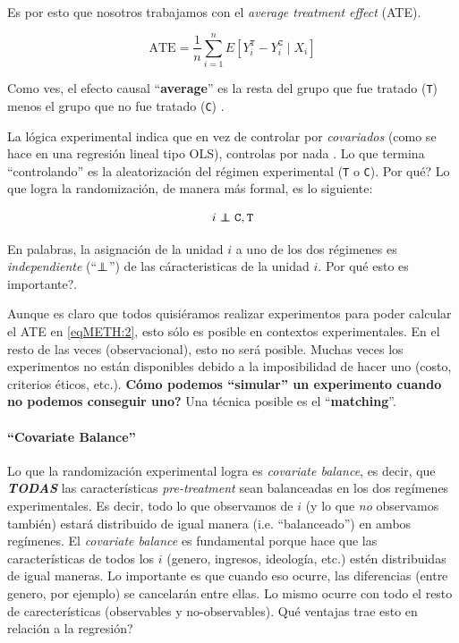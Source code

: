 \documentclass[onesided]{article}\usepackage[]{graphicx}\usepackage[]{color}
\newcommand\independent{\protect\mathpalette{\protect\independenT}{\perp}}
\def\independenT#1#2{\mathrel{\rlap{$#1#2$}\mkern2mu{#1#2}}}
\begin{document}
\paragraph{}Es por esto que nosotros trabajamos con el \emph{average treatment effect} (ATE).

\begin{equation}\label{eqMETH:2}
\text{ATE} = \frac{1}{n}\sum^{n}_{i=1} E[Y_{i}^{\texttt{T}}-Y_{i}^{\texttt{C}} \;|\; X_{i} ]
\end{equation}


Como ves, el efecto causal ``{\bf average}'' es la resta del grupo que fue tratado  (\texttt{T})  menos el grupo que no fue tratado (\texttt{C}) \parencite[204]{Ho2006}.

La l\'ogica experimental indica que en vez de controlar por \emph{covariados} (como se hace en una regresi\'on lineal tipo OLS), controlas por nada \parencite[6]{Guo:2009il}. Lo que termina ``controlando'' es la aleatorizaci\'on del r\'egimen experimental (\texttt{T} o \texttt{C}). {\color{red}Por qu\'e?} Lo que logra la randomizaci\'on, de manera m\'as formal, es lo siguiente:

\begin{equation}\label{eqMETH:5b}
i \independent \text{\texttt{C}}, \text{\texttt{T}}
\end{equation}

En palabras, la asignaci\'on de la unidad $i$ a uno de los dos r\'egimenes es \emph{independiente} (``$\independent$'') de las c\'aracteristicas de la unidad $i$. {\color{red}Por qu\'e esto es importante?}.

Aunque es claro que todos quisi\'eramos realizar experimentos para poder calcular el ATE en \autoref{eqMETH:2}, esto s\'olo es posible en contextos experimentales. En el resto de las veces (observacional), esto no ser\'a posible. Muchas veces los experimentos no est\'an disponibles debido a la imposibilidad de hacer uno (costo, criterios \'eticos, etc.). {\bf C\'omo podemos ``simular'' un experimento cuando no podemos conseguir uno?} Una t\'ecnica posible es el ``{\bf matching}''.

\paragraph{``Covariate Balance''} Lo que la randomizaci\'on experimental logra es \emph{covariate balance}, es decir, que \emph{{\bf TODAS}} las caracter\'isticas \emph{pre-treatment} sean balanceadas en los dos reg\'imenes experimentales. Es decir, todo lo que observamos de $i$ (y lo que \emph{no} observamos tambi\'en) estar\'a distribuido de igual manera (i.e. ``balanceado'') en ambos reg\'imenes. El \emph{covariate balance} es fundamental porque hace que las caracter\'isticas de todos los $i$ (genero, ingresos, ideolog\'ia, etc.) est\'en distribuidas de igual maneras. Lo importante es que cuando eso ocurre, las diferencias (entre genero, por ejemplo) se cancelar\'an entre ellas. Lo mismo ocurre con todo el resto de carecter\'isticas (observables y no-observables). {\color{red}Qu\'e ventajas trae esto en relaci\'on a la regresi\'on?}
\end{document}
